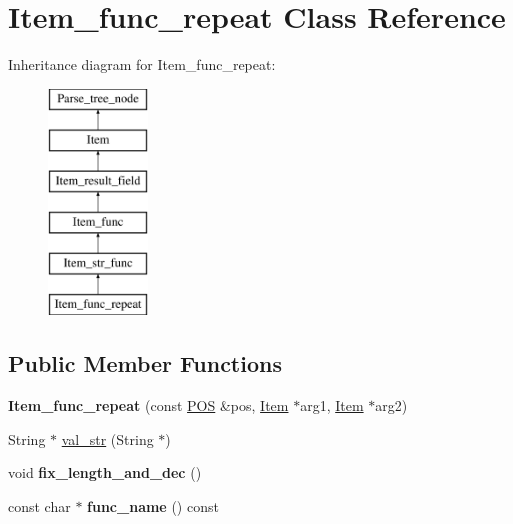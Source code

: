 \hypertarget{classItem__func__repeat}{}\section{Item\+\_\+func\+\_\+repeat Class Reference}
\label{classItem__func__repeat}
Inheritance diagram for Item\+\_\+func\+\_\+repeat\+:\begin{figure}[H]
\begin{center}
\leavevmode
\includegraphics[height=6.000000cm]{classItem__func__repeat}
\end{center}
\end{figure}
\subsection*{Public Member Functions}
\begin{DoxyCompactItemize}
\item 
\mbox{\label{classItem__func__repeat_a8efbdab31bf97c3bb7ef53add6517074}} 
{\bfseries Item\+\_\+func\+\_\+repeat} (const \mbox{\hyperlink{structYYLTYPE}{P\+OS}} \&pos, \mbox{\hyperlink{classItem}{Item}} $\ast$arg1, \mbox{\hyperlink{classItem}{Item}} $\ast$arg2)
\item 
String $\ast$ \mbox{\hyperlink{classItem__func__repeat_a9c6307db82de8955ae52be83b3da8fd7}{val\+\_\+str}} (String $\ast$)
\item 
\mbox{\label{classItem__func__repeat_a75b20e0cdea4ab63d6c97d6ee3be680b}} 
void {\bfseries fix\+\_\+length\+\_\+and\+\_\+dec} ()
\item 
\mbox{\label{classItem__func__repeat_a0e3e26e10e74bf2dcd80feed5787fc02}} 
const char $\ast$ {\bfseries func\+\_\+name} () const
\end{DoxyCompactItemize}
